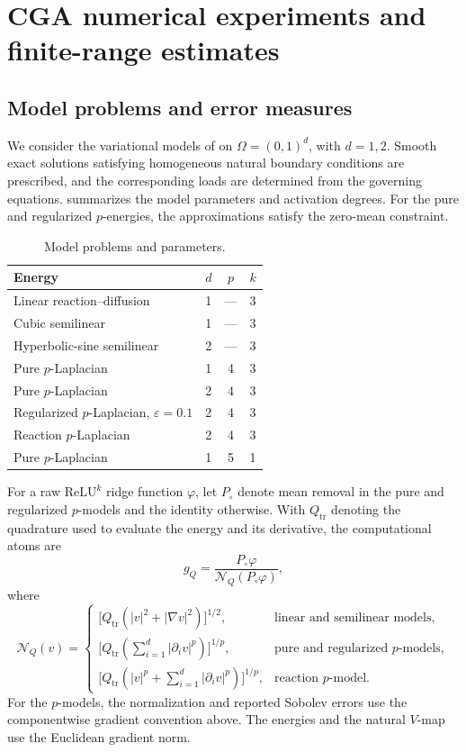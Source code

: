 \section{CGA numerical experiments and finite-range estimates}
\label{sec:numerics}

\subsection{Model problems and error measures}

We consider the variational models of  on \(\Omega=(0,1)^d\), with \(d=1,2\). Smooth exact solutions satisfying homogeneous natural boundary conditions are prescribed, and the corresponding loads are determined from the governing equations.  summarizes the model parameters and activation degrees. For the pure and regularized \(p\)-energies, the approximations satisfy the zero-mean constraint.

\begin{table}[!htbp]
\centering
\small
\caption{Model problems and parameters.}
\label{tab:cases}
\begin{tabular}{@{}lccc@{}}
\toprule
Energy & \(d\) & \(p\) & \(k\) \\
\midrule
Linear reaction--diffusion & 1 & --- & 3 \\
Cubic semilinear & 1 & --- & 3 \\
Hyperbolic-sine semilinear & 2 & --- & 3 \\
Pure \(p\)-Laplacian & 1 & 4 & 3 \\
Pure \(p\)-Laplacian & 2 & 4 & 3 \\
Regularized \(p\)-Laplacian, \(\varepsilon=0.1\) & 2 & 4 & 3 \\
Reaction \(p\)-Laplacian & 2 & 4 & 3 \\
Pure \(p\)-Laplacian & 1 & 5 & 1 \\
\bottomrule
\end{tabular}
\end{table}

For a raw \(\mathrm{ReLU}^k\) ridge function \(\varphi\), let \(P_\circ\) denote mean removal in the pure and regularized \(p\)-models and the identity otherwise. With \(Q_{\mathrm{tr}}\) denoting the quadrature used to evaluate the energy and its derivative, the computational atoms are
\[
g_Q=\frac{P_\circ\varphi}{\mathcal N_Q(P_\circ\varphi)},
\]
where
\[
\mathcal N_Q(v)=
\begin{cases}
\bigl[Q_{\mathrm{tr}}(|v|^2+|\nabla v|^2)\bigr]^{1/2},
& \text{linear and semilinear models},\\[2mm]
\bigl[Q_{\mathrm{tr}}(\sum_{i=1}^d|\partial_i v|^p)\bigr]^{1/p},
& \text{pure and regularized \(p\)-models},\\[2mm]
\bigl[Q_{\mathrm{tr}}(|v|^p+\sum_{i=1}^d|\partial_i v|^p)\bigr]^{1/p},
& \text{reaction \(p\)-model}.
\end{cases}
\]
For the \(p\)-models, the normalization and reported Sobolev errors use the componentwise gradient convention above. The energies and the natural \(V\)-map use the Euclidean gradient norm.

